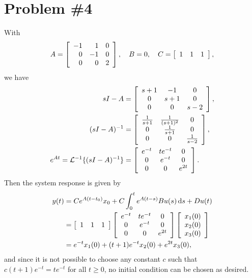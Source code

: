 \documentclass{article}
\begin{document}
\section*{Problem \#4}
With
$$
A = \left[\begin{array}{r r r}
      -1 & 1 & 0 \\ 0 & -1 & 0 \\ 0 & 0 & 2
    \end{array}\right], \quad
B = 0, \quad
C = \left[\begin{array}{c c c}
      1 & 1 & 1
    \end{array}\right],
$$
we have
\begin{align*}
s I - A 
&= \left[\begin{array}{c c c}
     s + 1 & -1    & 0 \\
     0     & s + 1 & 0 \\
     0     & 0     & s - 2
   \end{array}\right], \\
(s I - A)^{-1}
&= \left[\begin{array}{c c c}
     \frac{1}{s + 1} & \frac{1}{(s+1)^2} & 0 \\
     0               & \frac{1}{s + 1}   & 0 \\
     0               & 0                 & \frac{1}{s-2}
   \end{array}\right], \\
e^{At} = \mathcal{L}^{-1} \{ (s I - A)^{-1} \}
&= \left[\begin{array}{c c c}
     e^{-t} & t e^{-t} & 0 \\
     0     & e^{-t}   & 0 \\
     0     & 0       & e^{2t}
   \end{array}\right].
\end{align*}
Then the system response is given by
\begin{align*}
y(t) &= Ce^{A(t - t_0)}x_0 
      + C\int_0^t e^{A(t - s)} Bu(s) \dif s
      + Du(t) \\
     &= \left[\begin{array}{c c c}
          1 & 1 & 1
        \end{array}\right]
        \left[\begin{array}{c c c}
          e^{-t} & t e^{-t} & 0 \\
          0     & e^{-t}   & 0 \\
          0     & 0       & e^{2t}
        \end{array}\right]
        \left[\begin{array}{c}
          x_1(0) \\ x_2(0) \\ x_3(0)
        \end{array}\right] \\
      &= e^{-t}x_1(0) + (t + 1)e^{-t}x_2(0) + e^{2t}x_3(0),
\end{align*}
and since it is not possible to choose any constant $c$ such that
$c(t+1)e^{-t} = te^{-t}$ for all $t \geq 0$, no initial condition can
be chosen as desired.
\end{document}
